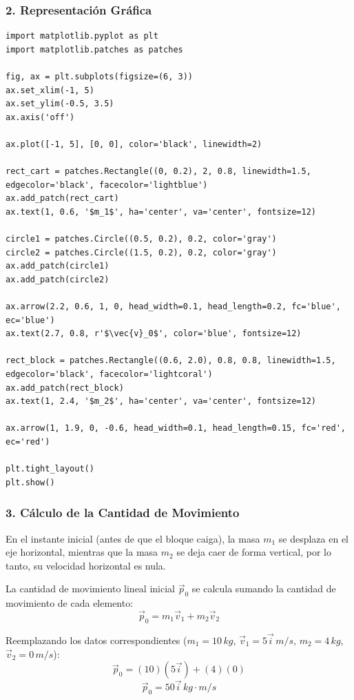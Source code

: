 \documentclass[12pt, a4paper]{article}
\begin{document}
\subsubsection*{2. Representación Gráfica}
\begin{lstlisting}
import matplotlib.pyplot as plt
import matplotlib.patches as patches

fig, ax = plt.subplots(figsize=(6, 3))
ax.set_xlim(-1, 5)
ax.set_ylim(-0.5, 3.5)
ax.axis('off')

ax.plot([-1, 5], [0, 0], color='black', linewidth=2)

rect_cart = patches.Rectangle((0, 0.2), 2, 0.8, linewidth=1.5, edgecolor='black', facecolor='lightblue')
ax.add_patch(rect_cart)
ax.text(1, 0.6, '$m_1$', ha='center', va='center', fontsize=12)

circle1 = patches.Circle((0.5, 0.2), 0.2, color='gray')
circle2 = patches.Circle((1.5, 0.2), 0.2, color='gray')
ax.add_patch(circle1)
ax.add_patch(circle2)

ax.arrow(2.2, 0.6, 1, 0, head_width=0.1, head_length=0.2, fc='blue', ec='blue')
ax.text(2.7, 0.8, r'$\vec{v}_0$', color='blue', fontsize=12)

rect_block = patches.Rectangle((0.6, 2.0), 0.8, 0.8, linewidth=1.5, edgecolor='black', facecolor='lightcoral')
ax.add_patch(rect_block)
ax.text(1, 2.4, '$m_2$', ha='center', va='center', fontsize=12)

ax.arrow(1, 1.9, 0, -0.6, head_width=0.1, head_length=0.15, fc='red', ec='red')

plt.tight_layout()
plt.show()
\end{lstlisting}

\subsubsection*{3. Cálculo de la Cantidad de Movimiento}
En el instante inicial (antes de que el bloque caiga), la masa $m_1$ se desplaza en el eje horizontal, mientras que la masa $m_2$ se deja caer de forma vertical, por lo tanto, su velocidad horizontal es nula.

La cantidad de movimiento lineal inicial $\vec{p}_0$ se calcula sumando la cantidad de movimiento de cada elemento:
\[ \vec{p}_0 = m_1 \vec{v}_1 + m_2 \vec{v}_2 \]

Reemplazando los datos correspondientes ($m_1 = 10 \, \si{kg}$, $\vec{v}_1 = 5 \vec{i} \, \si{m/s}$, $m_2 = 4 \, \si{kg}$, $\vec{v}_2 = 0 \, \si{m/s}$):
\[ \vec{p}_0 = (10)(5 \vec{i}) + (4)(0) \]
\[ \vec{p}_0 = 50 \vec{i} \, \si{kg\cdot m/s} \]
\end{document}
